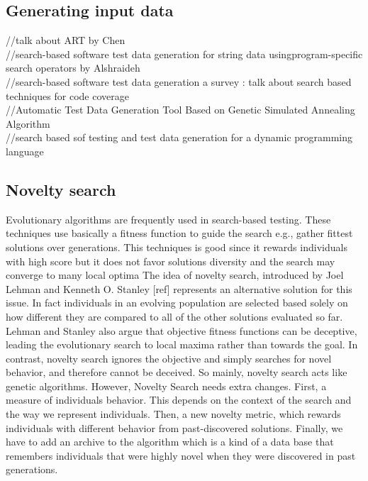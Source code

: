 \documentclass[conference]{IEEEtran}
\begin{document}
\subsection{Generating input data}
//talk about ART by Chen\\
//search-based software test data generation for string data usingprogram-specific search operators by Alshraideh\\
//search-based software test data generation a survey : talk about search based techniques for code coverage\\
//Automatic Test Data Generation Tool Based on Genetic
Simulated Annealing Algorithm\\
//search based sof testing and test data generation for a dynamic programming language 

\subsection{Novelty search}
Evolutionary algorithms are frequently used in search-based testing. These techniques use basically a fitness function to guide the search e.g., gather fittest solutions over generations. This techniques is good since it rewards individuals with high score but it does not favor solutions diversity and the search may converge to many local optima
The idea of novelty search, introduced by Joel Lehman and Kenneth O. Stanley [ref] represents an alternative solution for this issue. In fact individuals in an evolving population are selected based solely on how different they are compared to all of the other solutions evaluated so far.
Lehman and Stanley also argue that objective fitness functions can be deceptive, leading the evolutionary search to local maxima rather than towards the goal. In contrast, novelty search ignores the objective and simply searches for novel behavior, and therefore cannot be deceived. So mainly, novelty search acts like genetic algorithms. However, Novelty Search needs extra changes. First, a measure of individuals behavior. This depends on the context of the search and the way we represent individuals. Then, a new novelty metric, which rewards individuals with different behavior from past-discovered solutions. Finally, we have to add an archive to the algorithm which is a kind of a data base that remembers individuals that were highly novel when they were discovered in past generations.
\end{document}
